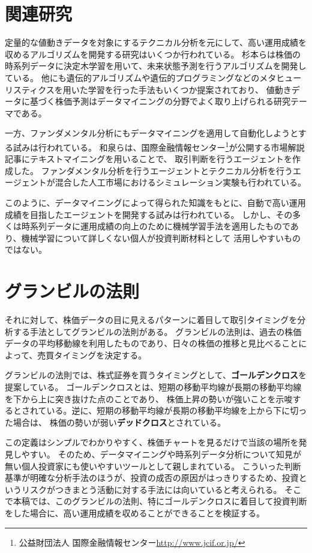 \documentclass[twocolumn,jsaiac]{jarticle}
\begin{document}
\section{関連研究}
定量的な値動きデータを対象にするテクニカル分析を元にして、高い運用成績を収めるアルゴリズムを開発する研究はいくつか行われている。
杉本らは株価の時系列データに決定木学習を用いて、未来状態予測を行うアルゴリズムを開発している\cite{decisiontree}。
他にも遺伝的アルゴリズムや遺伝的プログラミングなどのメタヒューリスティクスを用いた学習を行った手法もいくつか提案されており\cite{ga, gp}、
値動きデータに基づく株価予測はデータマイニングの分野でよく取り上げられる研究テーマである。

一方、ファンダメンタル分析にもデータマイニングを適用して自動化しようとする試みは行われている。
和泉らは、国際金融情報センター\footnote{公益財団法人 国際金融情報センター\url{http://www.jcif.or.jp/}}が公開する市場解説記事にテキストマイニングを用いることで、
取引判断を行うエージェントを作成した\cite{multiagent}。
ファンダメンタル分析を行うエージェントとテクニカル分析を行うエージェントが混合した人工市場におけるシミュレーション実験も行われている\cite{short}。

このように、データマイニングによって得られた知識をもとに、自動で高い運用成績を目指したエージェントを開発する試みは行われている。
しかし、その多くは時系列データに運用成績の向上のために機械学習手法を適用したものであり、機械学習について詳しくない個人が投資判断材料として
活用しやすいものではない。

\section{グランビルの法則}
それに対して、株価データの目に見えるパターンに着目して取引タイミングを分析する手法としてグランビルの法則がある。
グランビルの法則は、過去の株価データの平均移動線を利用したものであり、日々の株価の推移と見比べることによって、売買タイミングを決定する\cite{granville}。

グランビルの法則では、株式証券を買うタイミングとして、{\bf ゴールデンクロス}を提案している。
ゴールデンクロスとは、短期の移動平均線が長期の移動平均線を下から上に突き抜けた点のことであり、
株価上昇の勢いが強いことを示唆するとされている。逆に、短期の移動平均線が長期の移動平均線を上から下に切った場合は、
株価の勢いが弱い{\bf デッドクロス}とされている\cite{goldencross}。

この定義はシンプルでわかりやすく、株価チャートを見るだけで当該の場所を発見しやすい。
そのため、データマイニングや時系列データ分析について知見が無い個人投資家にも使いやすいツールとして親しまれている。
こういった判断基準が明確な分析手法のほうが、投資の成否の原因がはっきりするため、投資というリスクがつきまとう活動に対する手法には向いていると考えられる。
そこで本稿では、このグランビルの法則、特にゴールデンクロスに着目して投資判断をした場合に、高い運用成績を収めることができることを検証する。
\end{document}
